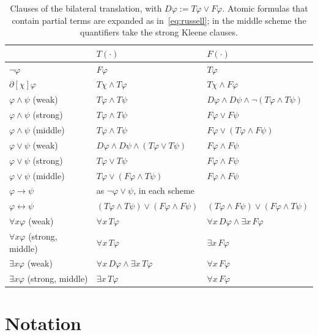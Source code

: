 \documentclass[11pt,a4paper]{article}
\theoremstyle{definition}
\begin{document}
\begin{table}[h]\centering\small
\renewcommand{\arraystretch}{1.25}
\begin{tabular}{@{}lll@{}}
\toprule
& $T(\cdot)$ & $F(\cdot)$\\
\midrule
$\neg\varphi$ & $F\varphi$ & $T\varphi$\\
$\partial[\chi]\varphi$ & $T\chi\wedge T\varphi$ & $T\chi\wedge F\varphi$\\
$\varphi\wedge\psi$ (weak) & $T\varphi\wedge T\psi$ & $D\varphi\wedge D\psi\wedge\neg(T\varphi\wedge T\psi)$\\
$\varphi\wedge\psi$ (strong) & $T\varphi\wedge T\psi$ & $F\varphi\vee F\psi$\\
$\varphi\wedge\psi$ (middle) & $T\varphi\wedge T\psi$ & $F\varphi\vee(T\varphi\wedge F\psi)$\\
$\varphi\vee\psi$ (weak) & $D\varphi\wedge D\psi\wedge(T\varphi\vee T\psi)$ & $F\varphi\wedge F\psi$\\
$\varphi\vee\psi$ (strong) & $T\varphi\vee T\psi$ & $F\varphi\wedge F\psi$\\
$\varphi\vee\psi$ (middle) & $T\varphi\vee(F\varphi\wedge T\psi)$ & $F\varphi\wedge F\psi$\\
$\varphi\to\psi$ & \multicolumn{2}{l}{as $\neg\varphi\vee\psi$, in each scheme}\\
$\varphi\leftrightarrow\psi$ & $(T\varphi\wedge T\psi)\vee(F\varphi\wedge F\psi)$ & $(T\varphi\wedge F\psi)\vee(F\varphi\wedge T\psi)$\\
$\forall x\varphi$ (weak) & $\forall x\,T\varphi$ & $\forall x\,D\varphi\wedge\exists x\,F\varphi$\\
$\forall x\varphi$ (strong, middle) & $\forall x\,T\varphi$ & $\exists x\,F\varphi$\\
$\exists x\varphi$ (weak) & $\forall x\,D\varphi\wedge\exists x\,T\varphi$ & $\forall x\,F\varphi$\\
$\exists x\varphi$ (strong, middle) & $\exists x\,T\varphi$ & $\forall x\,F\varphi$\\
\bottomrule
\end{tabular}
\caption{Clauses of the bilateral translation, with $D\varphi:=T\varphi\vee F\varphi$. Atomic formulas that contain partial terms are expanded as in~\eqref{eq:russell}; in the middle scheme the quantifiers take the strong Kleene clauses.}\label{tab:clauses}
\end{table}

\section{Notation}\label{app:notation}
\end{document}
